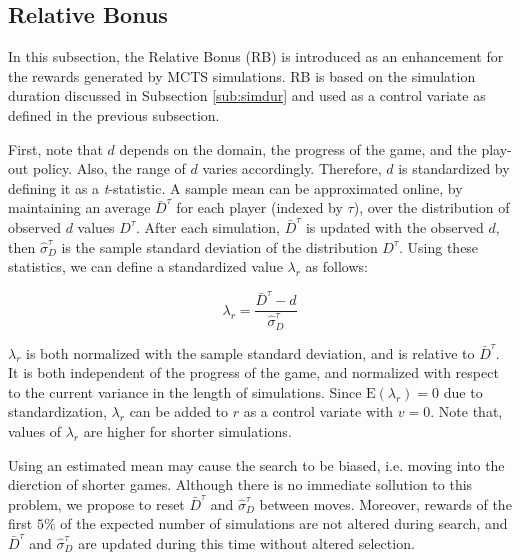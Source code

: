 \documentclass{ecai2014}
\newcommand{\E}[1]{\mathrm{E}\left( #1 \right)}
\begin{document}
\subsection{Relative Bonus}
\label{subsec:rb}
In this subsection, the Relative Bonus (RB) is introduced as an enhancement for the rewards generated by MCTS simulations. RB is based on the simulation duration discussed in Subsection \ref{sub:simdur} and used as a control variate as defined in the previous subsection.

First, note that $d$ depends on the domain, the progress of the game, and the play-out policy. 
Also, the range of $d$ varies accordingly. 
Therefore, $d$ is standardized by defining it as a \emph{t}-statistic. A sample mean can be approximated online, by maintaining an average $\bar{D}^\tau$ for each player (indexed by $\tau$), over the distribution of observed $d$ values $D^\tau$. After each simulation, $\bar{D}^\tau$ is updated with the observed $d$, then $\hat{\sigma}^\tau_D$ is the sample standard deviation of the distribution $D^\tau$. Using these statistics, we can define a standardized value $\lambda_r$ as follows:

\begin{equation}
\lambda_r = \frac{\bar{D}^\tau - d}{\hat{\sigma}^\tau_D}
\label{eq:rb_norm}
\end{equation}

$\lambda_r$ is both normalized with the sample standard deviation, and is relative to $\bar{D}^\tau$. It is both independent of the progress of the game, and normalized with respect to the current variance in the length of simulations. Since $\E{\lambda_r} = 0$ due to standardization, $\lambda_r$ can be added to $r$ as a control variate with $v = 0$. Note that, values of $\lambda_r$ are higher for shorter simulations.

Using an estimated mean may cause the search to be biased, i.e. moving into the dierction of shorter games. Although there is no immediate sollution to this problem, we propose to reset $\bar{D}^\tau$ and $\hat{\sigma}^\tau_D$ between moves. Moreover, rewards of the first $5\%$ of the expected number of simulations are not altered during search, and $\bar{D}^\tau$ and $\hat{\sigma}^\tau_D$ are updated during this time without altered selection.
\end{document}

